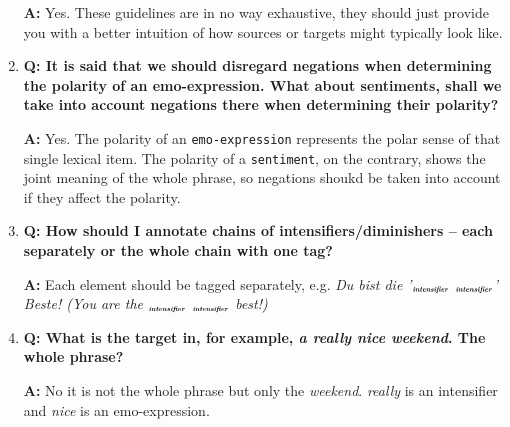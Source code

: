 \documentclass[11pt,a4paper]{article}
\theoremstyle{mytheoremstyle}
\newcommand{\mtag}[2]{{\upshape[\emph{#2}\upshape]$_{\textrm{\bfseries\emph{\tiny
        #1}}}$}}
\newcommand{\intensifier}[2][]{\mtag{in\-ten\-si\-fier\ifstrempty{#1}{}{:#1}}{#2}}
\begin{document}
\begin{enumerate}
  \textbf{A:} Yes. These guidelines are in no way exhaustive, they
  should just provide you with a better intuition of how sources or
  targets might typically look like.

\item\textbf{Q: It is said that we should disregard negations when
  determining the polarity of an emo-expression.  What about
  sentiments, shall we take into account negations there when
  determining their polarity?}

  \textbf{A:} Yes.  The polarity of an \texttt{emo-expression}
  represents the polar sense of that single lexical item.  The
  polarity of a \texttt{sentiment}, on the contrary, shows the joint
  meaning of the whole phrase, so negations shoukd be taken into
  account if they affect the polarity.

\item\textbf{Q: How should I annotate chains of
  intensifiers/diminishers -- each separately or the whole chain with
  one tag?}

  \textbf{A:} Each element should be tagged separately,
  e.g. \textit{Du bist die '\intensifier{aller} \intensifier{aller}'
    Beste! (You are the \intensifier{very} \intensifier{very} best!)}

\item\textbf{Q: What is the target in, for example, \textit{a really nice weekend}.
	The whole phrase?}

  \textbf{A:} No it is not the whole phrase but only the
  \textit{weekend}. \textit{really} is an intensifier and
  \textit{nice} is an emo-expression.


\end{enumerate}
\end{document}
